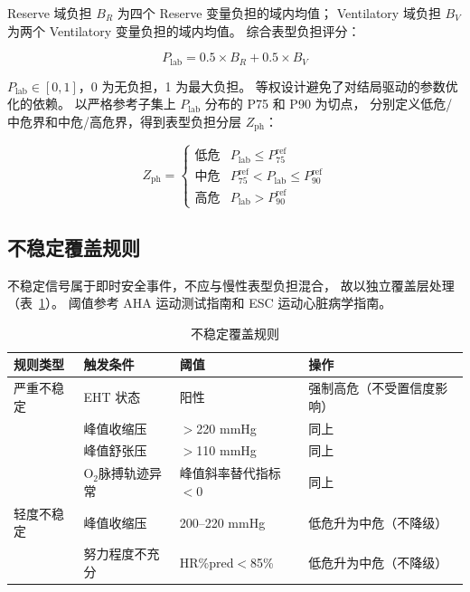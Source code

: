 \documentclass[12pt, a4paper]{ctexart}
\begin{document}
Reserve 域负担 $B_R$ 为四个 Reserve 变量负担的域内均值；
Ventilatory 域负担 $B_V$ 为两个 Ventilatory 变量负担的域内均值。
综合表型负担评分：

\begin{equation}
\label{eq:plab}
P_{\text{lab}} = 0.5 \times B_R + 0.5 \times B_V
\end{equation}

$P_{\text{lab}} \in [0, 1]$，0 为无负担，1 为最大负担。
等权设计避免了对结局驱动的参数优化的依赖。
以严格参考子集上 $P_{\text{lab}}$ 分布的 P75 和 P90 为切点，
分别定义低危/中危界和中危/高危界，得到表型负担分层 $Z_{\text{ph}}$：

\begin{equation}
\label{eq:phenotype_zone}
Z_{\text{ph}} =
\begin{cases}
\text{低危}  & P_{\text{lab}} \leq P_{75}^{\text{ref}} \\
\text{中危} & P_{75}^{\text{ref}} < P_{\text{lab}} \leq P_{90}^{\text{ref}} \\
\text{高危}    & P_{\text{lab}} > P_{90}^{\text{ref}}
\end{cases}
\end{equation}

\subsection{不稳定覆盖规则}

不稳定信号属于即时安全事件，不应与慢性表型负担混合，
故以独立覆盖层处理（表~\ref{tab:instability_rules}）。
阈值参考 AHA 运动测试指南\cite{Fletcher2013}和 ESC 运动心脏病学指南\cite{Pelliccia2022}。

\begin{table}[htbp]
\centering
\small
\caption{不稳定覆盖规则}
\label{tab:instability_rules}
\begin{tabular}{llll}
\toprule
规则类型 & 触发条件 & 阈值 & 操作 \\
\midrule
严重不稳定 & EHT 状态 & 阳性 & 强制高危（不受置信度影响）\\
 & 峰值收缩压 & $>$220 mmHg & 同上 \\
 & 峰值舒张压 & $>$110 mmHg & 同上 \\
 & O$_2$脉搏轨迹异常 & 峰值斜率替代指标$<$0 & 同上 \\
\midrule
轻度不稳定 & 峰值收缩压 & 200--220 mmHg & 低危升为中危（不降级）\\
 & 努力程度不充分 & HR\%pred$<$85\% & 低危升为中危（不降级）\\
\bottomrule
\end{tabular}
\end{table}
\end{document}
